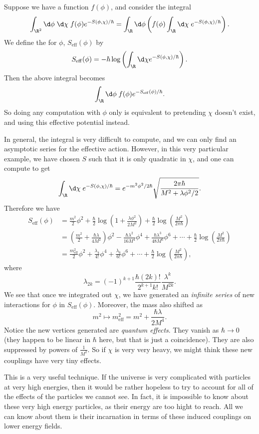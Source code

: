 \documentclass[a4paper]{article}
\begin{document}
Suppose we have a function $f(\phi)$, and consider the integral
\[
  \int_{\R^2} \d \phi\;\d \chi\; f(\phi) e^{-S(\phi, \chi)/\hbar} = \int_\R \d \phi \left(f(\phi) \int_\R \d \chi\;e^{-S(\phi, \chi)/\hbar}\right).
\]
We define the  for $\phi$, $S_{\mathrm{eff}}(\phi)$ by
\[
  S_{\mathrm{eff}}(\phi) = -\hbar \log \left(\int_\R \d \chi e^{-S(\phi, \chi)/\hbar}\right).
\]
Then the above integral becomes
\[
  \int_\R \d \phi\; f(\phi) e^{-S_{\mathrm{eff}}(\phi)/\hbar}.
\]
So doing any computation with $\phi$ only is equivalent to pretending $\chi$ doesn't exist, and using this effective potential instead.


In general, the integral is very difficult to compute, and we can only find an asymptotic series for the effective action. However, in this very particular example, we have chosen $S$ such that it is only quadratic in $\chi$, and one can compute to get
\[
  \int_\R \d \chi\; e^{-S(\phi, \chi)/\hbar} = e^{-m^2 \phi^2/2\hbar} \sqrt{\frac{2\pi \hbar}{M^2 + \lambda \phi^2/2}}.
\]
Therefore we have
\begin{align*}
  S_{\mathrm{eff}}(\phi) &= \frac{m^2}{2}\phi^2 + \frac{\hbar}{2} \log \left(1 + \frac{\lambda \phi^2}{2M^2}\right) + \frac{\hbar}{2} \log \left(\frac{M^2}{2\pi \hbar}\right)\\
  &= \left(\frac{m^2}{2} + \frac{\hbar \lambda}{4M^2}\right)\phi^2 - \frac{\hbar \lambda^2}{16 M^4} \phi^4 + \frac{\hbar \lambda^3}{48 M^6} \phi^6 + \cdots + \frac{\hbar}{2} \log \left(\frac{M^2}{2\pi \hbar}\right)\\
  &= \frac{m_{\mathrm{eff}}^2}{2} \phi^2 + \frac{\lambda_4}{4!} \phi^4 + \frac{\lambda_6}{6!} \phi^6 + \cdots + \frac{\hbar}{2} \log \left(\frac{M^2}{2\pi \hbar}\right),
\end{align*}
where
\[
  \lambda_{2k} = (-1)^{k + 1} \frac{\hbar (2k)!}{2^{k + 1}k!} \frac{\lambda^k}{M^{2k}}.
\]
We see that once we integrated out $\chi$, we have generated an \emph{infinite series} of new interactions for $\phi$ in $S_{\mathrm{eff}} (\phi)$. Moreover, the mass also shifted as
\[
  m^2 \mapsto m^2_{\mathrm{eff}} = m^2 + \frac{\hbar \lambda}{2M^4}.
\]
Notice the new vertices generated are \emph{quantum effects}. They vanish as $\hbar \to 0$ (they happen to be linear in $\hbar$ here, but that is just a coincidence). They are also suppressed by powers of $\frac{1}{M^2}$. So if $\chi$ is very very heavy, we might think these new couplings have very tiny effects.

This is a very useful technique. If the universe is very complicated with particles at very high energies, then it would be rather hopeless to try to account for all of the effects of the particles we cannot see. In fact, it is impossible to know about these very high energy particles, as their energy are too hight to reach. All we can know about them is their incarnation in terms of these induced couplings on lower energy fields.
\end{document}
